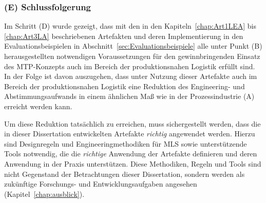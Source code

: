 \subsubsection{(E) Schlussfolgerung}

Im Schritt (D) wurde gezeigt, dass mit den in den Kapiteln~\ref{chap:Art1LEA} bis \ref{chap:Art3LA} beschriebenen Artefakten und deren Implementierung in den Evaluationsbeispielen in Abschnitt~\ref{sec:Evaluationsbeispiele} alle unter Punkt (B) herausgestellten notwendigen Voraussetzungen für den gewinnbringenden Einsatz des MTP-Konzepts auch im Bereich der produktionsnahen Logistik erfüllt sind. In der Folge ist davon auszugehen, dass unter Nutzung dieser Artefakte auch im Bereich der produktionsnahen Logistik eine Reduktion des Engineering- und Abstimmungsaufwands in einem ähnlichen Maß wie in der Prozessindustrie (A) erreicht werden kann. 

Um diese Reduktion tatsächlich zu erreichen, muss sichergestellt werden, dass die in dieser Dissertation entwickelten Artefakte \emph{richtig} angewendet werden. Hierzu sind Designregeln und Engineeringmethodiken für MLS sowie unterstützende Tools notwendig, die die \emph{richtige} Anwendung der Artefakte definieren und deren Anwendung in der Praxis unterstützen. Diese Methodiken, Regeln und Tools sind nicht Gegenstand der Betrachtungen dieser Dissertation, sondern werden als zukünftige Forschungs- und Entwicklungsaufgaben angesehen (Kapitel~\ref{chap:ausblick}).
